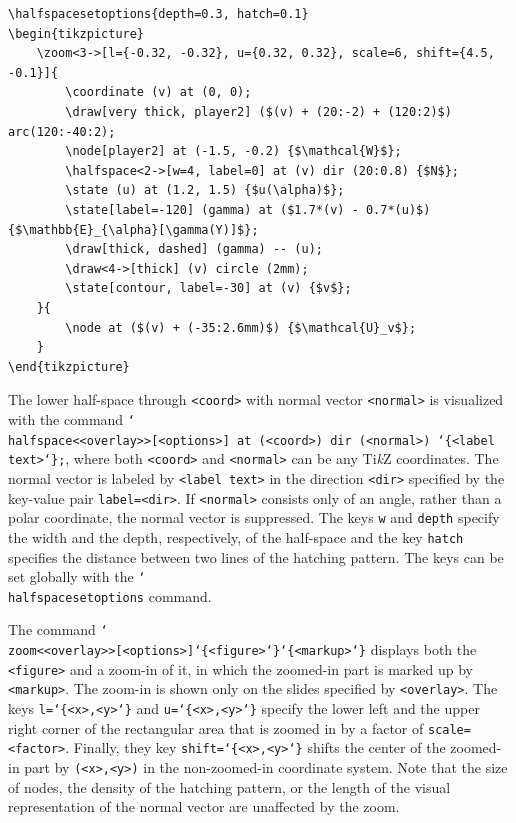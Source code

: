 \documentclass{article}
\renewcommand{\textbackslash}{\char`\\}
\def\cmd#1{\texttt{\color{cmd}\textbackslash#1}}
\def\leftbrace{\char`\{}
\def\rightbrace{\char`\}}
\def\arg#1{{\color{cmd}\leftbrace}{\color{black}#1}{\color{cmd}\rightbrace}}
\def\optarg[#1]{{\color{player1}[#1]}}
\def\TikZ{Ti\emph{k}Z\xspace}
\begin{document}
\begin{verbatim}
\halfspacesetoptions{depth=0.3, hatch=0.1}
\begin{tikzpicture}
	\zoom<3->[l={-0.32, -0.32}, u={0.32, 0.32}, scale=6, shift={4.5, -0.1}]{
		\coordinate (v) at (0, 0);
		\draw[very thick, player2] ($(v) + (20:-2) + (120:2)$) arc(120:-40:2);
		\node[player2] at (-1.5, -0.2) {$\mathcal{W}$};
		\halfspace<2->[w=4, label=0] at (v) dir (20:0.8) {$N$};
		\state (u) at (1.2, 1.5) {$u(\alpha)$};
		\state[label=-120] (gamma) at ($1.7*(v) - 0.7*(u)$) {$\mathbb{E}_{\alpha}[\gamma(Y)]$};
		\draw[thick, dashed] (gamma) -- (u);
		\draw<4->[thick] (v) circle (2mm);
		\state[contour, label=-30] at (v) {$v$};
	}{
		\node at ($(v) + (-35:2.6mm)$) {$\mathcal{U}_v$};
	}
\end{tikzpicture}
\end{verbatim}
\vspace{-1mm}

The lower half-space through \texttt{<coord>} with normal vector \texttt{<normal>} is visualized with the command \cmd{halfspace}\texttt{<<overlay>>\optarg[<options>] at (<coord>) dir (<normal>) \arg{<label text>};}, where both \texttt{<coord>} and \texttt{<normal>} can be any \TikZ coordinates. The normal vector is labeled by \texttt{<label text>} in the direction \texttt{<dir>} specified by the key-value pair \texttt{label=<dir>}. If \texttt{<normal>} consists only of an angle, rather than a polar coordinate, the normal vector is suppressed. The keys \texttt{w} and \texttt{depth} specify the width and the depth, respectively, of the half-space and the key \texttt{hatch} specifies the distance between two lines of the hatching pattern. The keys can be set globally with the \cmd{halfspacesetoptions} command.

The command \cmd{zoom}\texttt{<<overlay>>\optarg[<options>]\arg{<figure>}\arg{<markup>}} displays both the \texttt{<figure>} and a zoom-in of it, in which the zoomed-in part is marked up by \texttt{<markup>}. The zoom-in is shown only on the slides specified by \texttt{<overlay>}. The keys \texttt{l=\arg{<x>,<y>}} and \texttt{u=\arg{<x>,<y>}} specify the lower left and the upper right corner of the rectangular area that is zoomed in by a factor of \texttt{scale=<factor>}. Finally, they key \texttt{shift=\arg{<x>,<y>}} shifts the center of the zoomed-in part by \texttt{(<x>,<y>)} in the non-zoomed-in coordinate system. Note that the size of nodes, the density of the hatching pattern, or the length of the visual representation of the normal vector are unaffected by the zoom.
\end{document}
